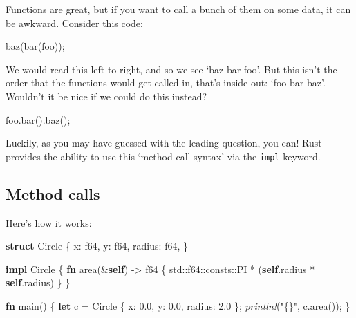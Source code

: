 \documentclass[a4paper,]{book}
\newenvironment{Shaded}{\begin{snugshade}}{\end{snugshade}}
\newcommand{\KeywordTok}[1]{\textcolor[rgb]{0.13,0.29,0.53}{\textbf{{#1}}}}
\newcommand{\DataTypeTok}[1]{\textcolor[rgb]{0.13,0.29,0.53}{{#1}}}
\newcommand{\DecValTok}[1]{\textcolor[rgb]{0.00,0.00,0.81}{{#1}}}
\newcommand{\StringTok}[1]{\textcolor[rgb]{0.31,0.60,0.02}{{#1}}}
\newcommand{\PreprocessorTok}[1]{\textcolor[rgb]{0.56,0.35,0.01}{\textit{{#1}}}}
\newcommand{\NormalTok}[1]{{#1}}
\begin{document}
Functions are great, but if you want to call a bunch of them on some
data, it can be awkward. Consider this code:

\begin{Shaded}
\begin{Highlighting}[]
\NormalTok{baz(bar(foo));}
\end{Highlighting}
\end{Shaded}

We would read this left-to-right, and so we see `baz bar foo'. But this
isn't the order that the functions would get called in, that's
inside-out: `foo bar baz'. Wouldn't it be nice if we could do this
instead?

\begin{Shaded}
\begin{Highlighting}[]
\NormalTok{foo.bar().baz();}
\end{Highlighting}
\end{Shaded}

Luckily, as you may have guessed with the leading question, you can!
Rust provides the ability to use this `method call syntax' via the
\texttt{impl} keyword.

\subsection{Method calls}\label{method-calls}

Here's how it works:

\begin{Shaded}
\begin{Highlighting}[]
\KeywordTok{struct} \NormalTok{Circle \{}
    \NormalTok{x: }\DataTypeTok{f64}\NormalTok{,}
    \NormalTok{y: }\DataTypeTok{f64}\NormalTok{,}
    \NormalTok{radius: }\DataTypeTok{f64}\NormalTok{,}
\NormalTok{\}}

\KeywordTok{impl} \NormalTok{Circle \{}
    \KeywordTok{fn} \NormalTok{area(&}\KeywordTok{self}\NormalTok{) -> }\DataTypeTok{f64} \NormalTok{\{}
        \NormalTok{std::}\DataTypeTok{f64}\NormalTok{::consts::PI * (}\KeywordTok{self}\NormalTok{.radius * }\KeywordTok{self}\NormalTok{.radius)}
    \NormalTok{\}}
\NormalTok{\}}

\KeywordTok{fn} \NormalTok{main() \{}
    \KeywordTok{let} \NormalTok{c = Circle \{ x: }\DecValTok{0.0}\NormalTok{, y: }\DecValTok{0.0}\NormalTok{, radius: }\DecValTok{2.0} \NormalTok{\};}
    \PreprocessorTok{println!}\NormalTok{(}\StringTok{"\{\}"}\NormalTok{, c.area());}
\NormalTok{\}}
\end{Highlighting}
\end{Shaded}
\end{document}
